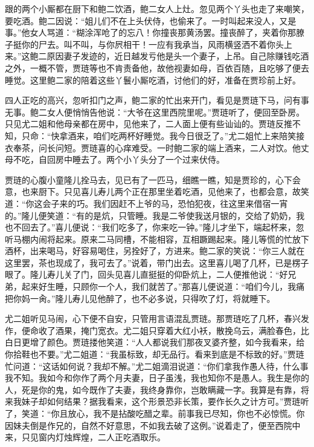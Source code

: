 跟的两个小厮都在厨下和鲍二饮酒，鲍二女人上灶。忽见两个丫头也走了来嘲笑，要吃酒。鲍二因说：``姐儿们不在上头伏侍，也偷来了。一时叫起来没人，又是事。''他女人骂道：``糊涂浑呛了的忘八！你撞丧那黄汤罢。撞丧醉了，夹着你那膫子挺你的尸去。叫不叫，与你屄相干！一应有我承当，风雨横竖洒不着你头上来。''这鲍二{原因妻子发迹的，近日越发亏他}{是头一个妻子，上吊}。自己除赚钱吃酒之外，一概不管，贾琏等也不肯责备他，故他视妻如母，百依百随，且吃够了便去睡觉。这里鲍二家的陪着这些丫鬟小厮吃酒，讨他们的好，准备在贾珍前上好。

四人正吃的高兴，忽听扣门之声，鲍二家的忙出来开门，看见是贾琏下马，问有事无事。鲍二女人便悄悄告他说：``大爷在这里西院里呢。''贾琏听了，便回至卧房。只见尤二姐和他母亲都在房中，见他来了，二人面上便有些讪讪的。贾琏反推不知，只命：``快拿酒来，咱们吃两杯好睡觉。我今日很乏了。''尤二姐忙上来陪笑接衣奉茶，问长问短。贾琏喜的心痒难受。一时鲍二家的端上酒来，二人对饮。他丈母不吃，自回房中睡去了。两个小丫头分了一个过来伏侍。

贾琏的心腹小童隆儿拴马去，见已有了一匹马，细瞧一瞧，知是贾珍的，心下会意，也来厨下。只见喜儿寿儿两个正在那里坐着吃酒，见他来了，也都会意，故笑道：``你这会子来的巧。我们因赶不上爷的马，恐怕犯夜，往这里来借宿一宵的。''隆儿便笑道：``有的是炕，只管睡。我是二爷使我送月银的，交给了奶奶，我也不回去了。''喜儿便说：``我们吃多了，你来吃一钟。''隆儿才坐下，端起杯来，忽听马棚内闹将起来。原来二马同槽，不能相容，互相蹶踢起来。隆儿等慌的忙放下酒杯，出来喝马，好容易喝住，另拴好了，方进来。鲍二家的笑说：``你三人就在这里罢，茶也现成了，我可去了。''说着，带门出去。这里喜儿喝了几杯，已是楞子眼了。隆儿寿儿关了门，回头见喜儿直挺挺的仰卧炕上，二人便推他说：``好兄弟，起来好生睡，只顾你一个人，我们就苦了。''那喜儿便说道：``咱们今儿，我痛把你妈一肏。''隆儿寿儿见他醉了，也不必多说，只得吹了灯，将就睡下。

尤二姐听见马闹，心下便不自安，只管用言语混乱贾琏。那贾琏吃了几杯，春兴发作，便命收了酒果，掩门宽衣。尤二姐只穿着大红小袄，散挽乌云，满脸春色，比白日更增了颜色。贾琏搂他笑道：``人人都说我们那夜叉婆齐整，如今我看来，给你拾鞋也不要。''尤二姐道：``我虽标致，却无品行。看来到底是不标致的好。''贾琏忙问道：``这话如何说？我却不解。''尤二姐滴泪说道：``你们拿我作愚人待，什么事我不知。我如今和你作了两个月夫妻，日子虽浅，我也知你不是愚人。我生是你的人，死是你的鬼，如今既作了夫妻，我终身靠你，岂敢瞒藏一字。我算是有靠，将来我妹子却如何结果？据我看来，这个形景恐非长策，要作长久之计方可。''贾琏听了，笑道：``你且放心，我不是拈酸吃醋之辈。前事我已尽知，你也不必惊慌。你因妹夫倒是作兄的，自然不好意思，不如我去破了这例。''说着走了，便至西院中来，只见窗内灯烛辉煌，二人正吃酒取乐。

